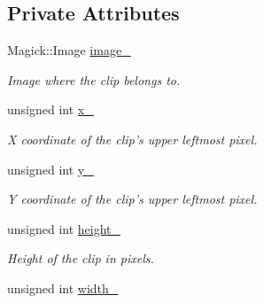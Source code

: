 \subsection*{Private Attributes}
\begin{CompactItemize}
\item 
\hypertarget{class_clip_1b1e880c583cbb3df5f16a2796142b38}{
Magick::Image \hyperlink{class_clip_1b1e880c583cbb3df5f16a2796142b38}{image\_\-}}
\label{class_clip_1b1e880c583cbb3df5f16a2796142b38}

\begin{CompactList}\small\item\em Image where the clip belongs to. \item\end{CompactList}\item 
\hypertarget{class_clip_9887474cc18fc3a901394f568d40c1fc}{
unsigned int \hyperlink{class_clip_9887474cc18fc3a901394f568d40c1fc}{x\_\-}}
\label{class_clip_9887474cc18fc3a901394f568d40c1fc}

\begin{CompactList}\small\item\em X coordinate of the clip's upper leftmost pixel. \item\end{CompactList}\item 
\hypertarget{class_clip_06f957c5fdf7a5149b84d97a9c694c12}{
unsigned int \hyperlink{class_clip_06f957c5fdf7a5149b84d97a9c694c12}{y\_\-}}
\label{class_clip_06f957c5fdf7a5149b84d97a9c694c12}

\begin{CompactList}\small\item\em Y coordinate of the clip's upper leftmost pixel. \item\end{CompactList}\item 
\hypertarget{class_clip_eac813b06cee742c237240d9b7ccc336}{
unsigned int \hyperlink{class_clip_eac813b06cee742c237240d9b7ccc336}{height\_\-}}
\label{class_clip_eac813b06cee742c237240d9b7ccc336}

\begin{CompactList}\small\item\em Height of the clip in pixels. \item\end{CompactList}\item 
\hypertarget{class_clip_ba0048c33d63c40629e568d301f64f59}{
unsigned int \hyperlink{class_clip_ba0048c33d63c40629e568d301f64f59}{width\_\-}}
\label{class_clip_ba0048c33d63c40629e568d301f64f59}


\end{CompactItemize}
